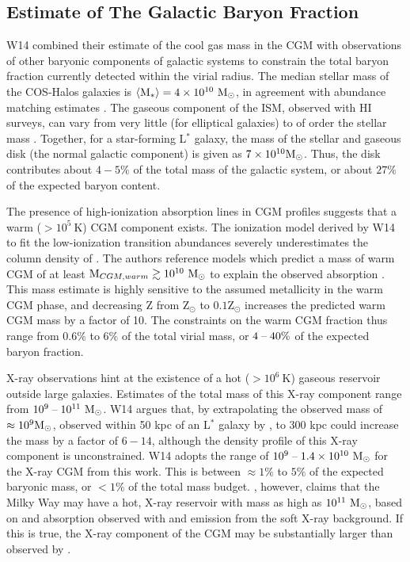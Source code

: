 \subsection{Estimate of The Galactic Baryon Fraction}
\label{sec:Galaxy.Fraction}

W14 combined their estimate of the cool gas mass in the CGM with
observations of other baryonic components of galactic systems to
constrain the total baryon fraction currently detected within the
virial radius. The median stellar mass of the COS-Halos galaxies is
$\left<\textrm{M}{}_*\right> = 4\times 10^{10}~\textrm{M}_\odot$, in agreement with
abundance matching estimates \citep{Behroozi2010}. The gaseous
component of the ISM, observed with HI surveys, can vary from very
little (for elliptical galaxies) to of order the stellar mass
\citep{McGaugh2010, Martin2010}. Together, for a star-forming L$^*$
galaxy, the mass of the stellar and gaseous disk (the normal galactic
component) is given as $7\times 10^{10}\textrm{M}_\odot{}$. Thus, the disk
contributes about $4-5\%$ of the total mass of the galactic system, or
about $27\%$ of the expected baryon content.

The presence of high-ionization absorption lines in CGM profiles
suggests that a warm ($>10^5~\textrm{K}$) CGM component exists. The
ionization model derived by W14 to fit the low-ionization transition
abundances severely underestimates the column density of
. The authors reference models which predict a mass of
warm CGM of at least $\textrm{M}_{CGM, warm} \gtrsim 10^{10}~\textrm{M}_\odot{}$ to
explain the observed  absorption \citep{Peeples2014}. This
mass estimate is highly sensitive to the assumed metallicity in the
warm CGM phase, and decreasing Z from Z$_\odot$ to $0.1$Z$_\odot$
increases the predicted warm CGM mass by a factor of 10. The
constraints on the warm CGM fraction thus range from $0.6\%$ to $6\%$
of the total virial mass, or $4\;\textrm{--}\;40\%$ of the expected baryon fraction.

X-ray observations hint at the existence of a hot ($>10^6~\textrm{K}$)
gaseous reservoir outside large galaxies. Estimates of the total mass
of this X-ray component range from $10^9\;\textrm{--}\;10^{11}~\textrm{M}_\odot{}$. W14
argues that, by extrapolating the observed mass of $\approx
10^9\textrm{M}_\odot{}$, observed within 50 kpc of an L$^*$ galaxy by \Rosat{}
\citep{Anderson2013}, to 300 kpc could increase the mass by a factor
of $6-14$, although the density profile of this X-ray component is
unconstrained. W14 adopts the range of $10^9 \;\textrm{--}\;
1.4\times 10^{10}~\textrm{M}_\odot{}$ for the X-ray CGM from this work. This is
between $\approx 1\%$ to $5\%$ of the expected baryonic mass, or
$<1\%$ of the total mass budget. \citet{Gupta2012}, however, claims
that the Milky Way may have a hot, X-ray reservoir with mass as high
as $10^{11}~\textrm{M}_\odot{}$, based on  and 
absorption observed with \XMM{} and emission from the soft X-ray
background. If this is true, the X-ray component of the CGM may be
substantially larger than observed by \citet{Anderson2013}.

